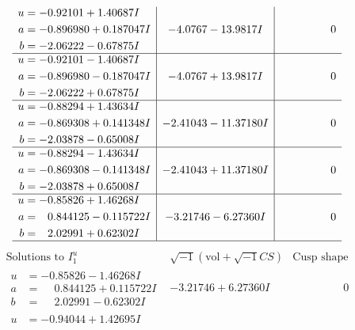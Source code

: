 \documentclass[1p]{elsarticle_modified}
\theoremstyle{definition}
\newcommand{\I}{\sqrt{-1}}
\begin{document}
$$\begin{array}{c|c|c}
\begin{aligned}
u &= -0.92101 + 1.40687 I \\
a &= -0.896980 + 0.187047 I \\
b &= -2.06222 - 0.67875 I\end{aligned}
 & -4.0767 - 13.9817 I & \phantom{-0.000000 } 0 \\ \hline\begin{aligned}
u &= -0.92101 - 1.40687 I \\
a &= -0.896980 - 0.187047 I \\
b &= -2.06222 + 0.67875 I\end{aligned}
 & -4.0767 + 13.9817 I & \phantom{-0.000000 } 0 \\ \hline\begin{aligned}
u &= -0.88294 + 1.43634 I \\
a &= -0.869308 + 0.141348 I \\
b &= -2.03878 - 0.65008 I\end{aligned}
 & -2.41043 - 11.37180 I & \phantom{-0.000000 } 0 \\ \hline\begin{aligned}
u &= -0.88294 - 1.43634 I \\
a &= -0.869308 - 0.141348 I \\
b &= -2.03878 + 0.65008 I\end{aligned}
 & -2.41043 + 11.37180 I & \phantom{-0.000000 } 0 \\ \hline\begin{aligned}
u &= -0.85826 + 1.46268 I \\
a &= \phantom{-}0.844125 - 0.115722 I \\
b &= \phantom{-}2.02991 + 0.62302 I\end{aligned}
 & -3.21746 - 6.27360 I & \phantom{-0.000000 } 0\\
 \hline 
 \end{array}$$\newpage$$\begin{array}{c|c|c}  
\text{Solutions to }I^u_{1}& \I (\text{vol} + \sqrt{-1}CS) & \text{Cusp shape}\\
 \hline 
\begin{aligned}
u &= -0.85826 - 1.46268 I \\
a &= \phantom{-}0.844125 + 0.115722 I \\
b &= \phantom{-}2.02991 - 0.62302 I\end{aligned}
 & -3.21746 + 6.27360 I & \phantom{-0.000000 } 0 \\ \hline\begin{aligned}
u &= -0.94044 + 1.42695 I \\

\end{aligned}
\end{array}$$
\end{document}
